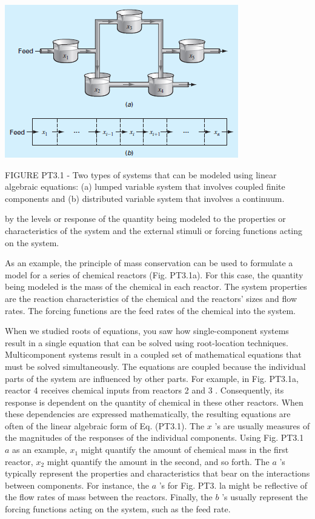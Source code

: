 \documentclass[../main.tex]{subfiles}
\begin{document}
\begin{center}
    \includegraphics[width=0.6\linewidth]{./images/fig_PT3_1}

    \textsf{FIGURE PT3.1 - Two types of systems that can be modeled using linear algebraic equations: (a) lumped variable
    system that involves coupled finite components and (b) distributed variable system that involves
    a continuum.}
\end{center}

\noindent by the levels or response of the quantity being modeled to the properties or characteristics of the system and the external stimuli or forcing functions acting on the system.

As an example, the principle of mass conservation can be used to formulate a model for a series of chemical reactors (Fig. PT3.1a). For this case, the quantity being modeled is the mass of the chemical in each reactor. The system properties are the reaction characteristics of the chemical and the reactors' sizes and flow rates. The forcing functions are the feed rates of the chemical into the system.

When we studied roots of equations, you saw how single-component systems result in a single equation that can be solved using root-location techniques. Multicomponent systems result in a coupled set of mathematical equations that must be solved simultaneously. The equations are coupled because the individual parts of the system are influenced by other parts. For example, in Fig. PT3.1a, reactor 4 receives chemical inputs from reactors 2 and 3 . Consequently, its response is dependent on the quantity of chemical in these other reactors.
When these dependencies are expressed mathematically, the resulting equations are often of the linear algebraic form of Eq. (PT3.1). The $x$ 's are usually measures of the magnitudes of the responses of the individual components. Using Fig. PT3.1 $a$ as an example, $x_{1}$ might quantify the amount of chemical mass in the first reactor, $x_{2}$ might quantify the amount in the second, and so forth. The $a$ 's typically represent the properties and characteristics that bear on the interactions between components. For instance, the $a$ 's for Fig. PT3. la might be reflective of the flow rates of mass between the reactors. Finally, the $b$ 's usually represent the forcing functions acting on the system, such as the feed rate.
\end{document}
